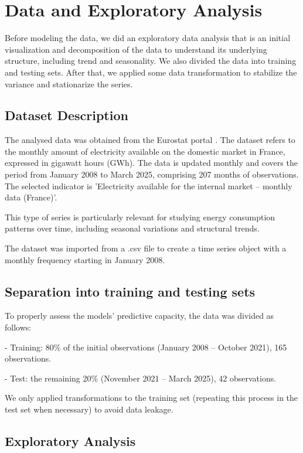 \section{Data and Exploratory Analysis}

Before modeling the data, we did an exploratory data analysis that is an initial visualization and decomposition of the data to understand its underlying structure, including trend and seasonality. We also divided the data into training and testing sets.
After that, we applied some data transformation to stabilize the variance and stationarize the series.\

\subsection{Dataset Description}
The analysed data was obtained from the Eurostat portal \cite{EurostatElectricityConsumption}. The dataset refers to the monthly amount of electricity available on the domestic market in France, expressed in gigawatt hours (GWh).
The data is updated monthly and covers the period from January 2008 to March 2025, comprising 207 months of observations.
The selected indicator is 'Electricity available for the internal market – monthly data (France)'.

This type of series is particularly relevant for studying energy consumption patterns over time, including seasonal variations and structural trends.

The dataset was imported from a .csv file to create a time series object with a monthly frequency starting in January 2008.

\subsection{Separation into training and testing sets}

To properly assess the models' predictive capacity, the data was divided as follows:

- Training: 80\% of the initial observations (January 2008 – October 2021), 165 observations.

- Test: the remaining 20\% (November 2021 – March 2025), 42 observations.

We only applied transformations to the training set (repeating this process in the test set when necessary) to avoid data leakage.

\subsection{Exploratory Analysis}

